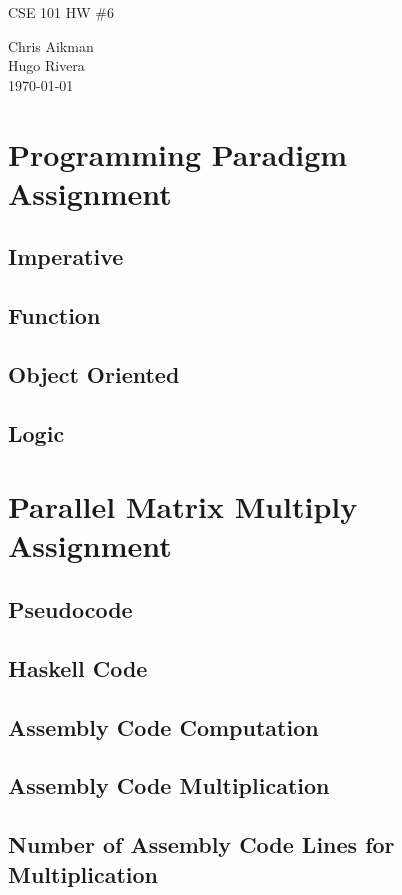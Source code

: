 \documentclass[hidelinks,12pt]{article}
\begin{document}
\begin{titlepage}
\begin{center}
\Huge {CSE 101 HW \#6}\\
[1cm]
\normalsize

Chris Aikman\\
Hugo Rivera\\
[1cm]

{\today}

\end{center}
\end{titlepage}

\newpage

\section{Programming Paradigm Assignment}
\subsection{Imperative}
\subsection{Function}
\subsection{Object Oriented}
\subsection{Logic}

\section{Parallel Matrix Multiply Assignment}
\subsection{Pseudocode}
\subsection{Haskell Code}
\subsection{Assembly Code Computation}
\subsection{Assembly Code Multiplication}
\subsection{Number of Assembly Code Lines for Multiplication}
\end{document}
